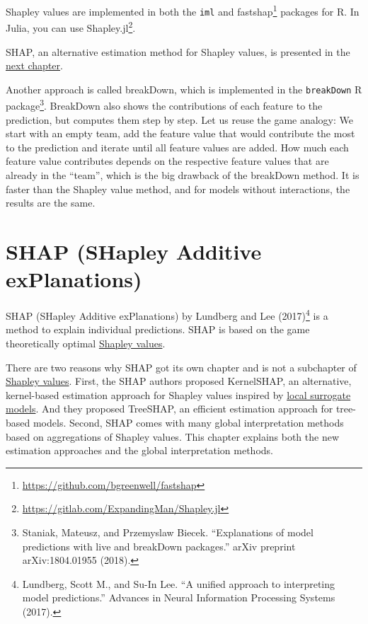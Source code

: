 \documentclass[
  10pt,
]{scrbook}
\renewcommand{\href}[2]{#2\footnote{\url{#1}}}
\begin{document}
Shapley values are implemented in both the \texttt{iml} and \href{https://github.com/bgreenwell/fastshap}{fastshap} packages for R.
In Julia, you can use \href{https://gitlab.com/ExpandingMan/Shapley.jl}{Shapley.jl}.

SHAP, an alternative estimation method for Shapley values, is presented in the \protect\hyperlink{shap}{next chapter}.

Another approach is called breakDown, which is implemented in the \texttt{breakDown} R package\footnote{Staniak, Mateusz, and Przemyslaw Biecek. ``Explanations of model predictions with live and breakDown packages.'' arXiv preprint arXiv:1804.01955 (2018).}.
BreakDown also shows the contributions of each feature to the prediction, but computes them step by step.
Let us reuse the game analogy:
We start with an empty team, add the feature value that would contribute the most to the prediction and iterate until all feature values are added.
How much each feature value contributes depends on the respective feature values that are already in the ``team'', which is the big drawback of the breakDown method.
It is faster than the Shapley value method, and for models without interactions, the results are the same.

\newpage

\hypertarget{shap}{%
\section{SHAP (SHapley Additive exPlanations)}\label{shap}}

SHAP (SHapley Additive exPlanations) by Lundberg and Lee (2017)\footnote{Lundberg, Scott M., and Su-In Lee. ``A unified approach to interpreting model predictions.'' Advances in Neural Information Processing Systems (2017).} is a method to explain individual predictions.
SHAP is based on the game theoretically optimal \protect\hyperlink{shapley}{Shapley values}.

There are two reasons why SHAP got its own chapter and is not a subchapter of \protect\hyperlink{shapley}{Shapley values}.
First, the SHAP authors proposed KernelSHAP, an alternative, kernel-based estimation approach for Shapley values inspired by \protect\hyperlink{lime}{local surrogate models}.
And they proposed TreeSHAP, an efficient estimation approach for tree-based models.
Second, SHAP comes with many global interpretation methods based on aggregations of Shapley values.
This chapter explains both the new estimation approaches and the global interpretation methods.
\end{document}
